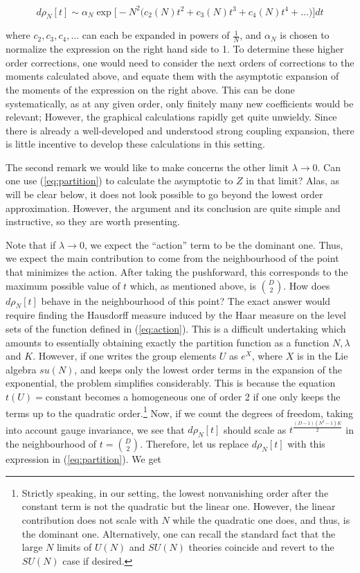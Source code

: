 \documentclass[twoside, a4paper,10pt]{article}
\newcommand{\ben}{\begin{equation*}}
\newcommand{\een}{\end{equation*}}
\newcommand{\txt}{\textrm}
\begin{document}
\ben
d \rho_N[t] \sim \alpha_N \exp \bigg [ - N^2\Big ( c_2(N) t^2 + c_3(N) t^3 + c_4(N) t^4 + \dots        \Big ) \bigg ] dt
\een

where $c_2, c_3, c_4, \dots$ can each be expanded in powers of $\frac{1}{N}$, and $\alpha_N$ is chosen to normalize the expression on the right hand side to 1. To determine these higher order corrections, one would need to consider the next orders of corrections to the moments calculated above, and equate them with the asymptotic expansion of the moments of the expression on the right above. This can be done systematically, as at any given order, only finitely many new coefficients would be relevant; However, the graphical calculations rapidly get quite unwieldy. Since there is already a well-developed and understood strong coupling expansion, there is little incentive to develop these calculations in this setting.  \newline


The second remark we would like to make concerns the other limit $\lambda \to 0$. Can one use (\ref{eq:partition}) to calculate the asymptotic to $Z$ in that limit? Alas, as will be clear below, it does not look possible to go beyond the lowest order approximation. However, the argument and its conclusion are quite simple and instructive, so they are worth presenting. \newline

Note that if $\lambda \to 0$, we expect the ``action'' term to be the dominant one. Thus, we expect the main contribution to come from the neighbourhood of the point that minimizes the action. After taking the pushforward, this corresponds to the maximum possible value of $t$ which, as mentioned above, is ${D \choose 2}$. How does $d\rho_N[t]$ behave in the neighbourhood of this point? The exact answer would require finding the Hausdorff measure induced by the Haar measure on the level sets of the function defined in (\ref{eq:action}). This is a difficult undertaking which amounts to essentially obtaining exactly the partition function as a function $N, \lambda$ and $K$. However, if one writes the group elements $U$ as $e^X$, where $X$ is in the Lie algebra $su(N)$, and keeps only the lowest order terms in the expansion of the exponential, the problem simplifies considerably. This is because the equation $t(U) = \txt{constant}$ becomes a homogeneous one of order 2 if one only keeps the terms up to the quadratic order.\footnote{Strictly speaking, in our setting, the lowest nonvanishing order after the constant term is not the quadratic but the linear one. However, the linear contribution does not scale with $N$ while the quadratic one does, and thus, is the dominant one. Alternatively, one can recall the standard fact that the large $N$ limits of $U(N)$ and $SU(N)$ theories coincide and revert to the $SU(N)$ case if desired. } Now, if we count the degrees of freedom, taking into account gauge invariance, we see that $d \rho_N[t]$ should scale as $t^{ \frac{ (D-1) (N^2 - 1) K    }{2}     }$ in the neighbourhood of $t = {D \choose 2}$. Therefore, let us replace $d \rho_N[t]$ with this expression in (\ref{eq:partition}). We get
\end{document}
